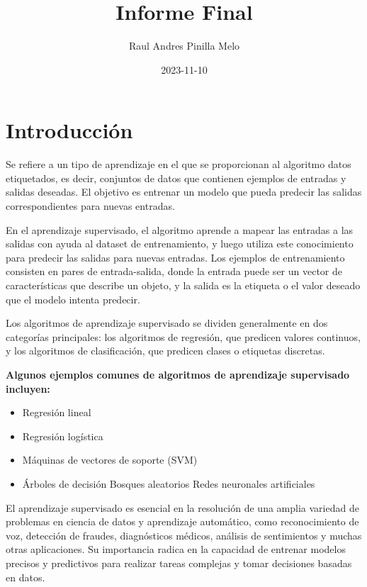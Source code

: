 \documentclass[
]{article}
\title{Informe Final}
\author{Raul Andres Pinilla Melo}
\date{2023-11-10}
\begin{document}
\maketitle

\hypertarget{introducciuxf3n}{%
\section{Introducción}\label{introducciuxf3n}}

Se refiere a un tipo de aprendizaje en el que se proporcionan al
algoritmo datos etiquetados, es decir, conjuntos de datos que contienen
ejemplos de entradas y salidas deseadas. El objetivo es entrenar un
modelo que pueda predecir las salidas correspondientes para nuevas
entradas.

En el aprendizaje supervisado, el algoritmo aprende a mapear las
entradas a las salidas con ayuda al dataset de entrenamiento, y luego
utiliza este conocimiento para predecir las salidas para nuevas
entradas. Los ejemplos de entrenamiento consisten en pares de
entrada-salida, donde la entrada puede ser un vector de características
que describe un objeto, y la salida es la etiqueta o el valor deseado
que el modelo intenta predecir.

Los algoritmos de aprendizaje supervisado se dividen generalmente en dos
categorías principales: los algoritmos de regresión, que predicen
valores continuos, y los algoritmos de clasificación, que predicen
clases o etiquetas discretas.

\textbf{Algunos ejemplos comunes de algoritmos de aprendizaje
supervisado incluyen:}

\begin{itemize}
\item
  Regresión lineal
\item
  Regresión logística
\item
  Máquinas de vectores de soporte (SVM)
\item
  Árboles de decisión Bosques aleatorios Redes neuronales artificiales
\end{itemize}

El aprendizaje supervisado es esencial en la resolución de una amplia
variedad de problemas en ciencia de datos y aprendizaje automático, como
reconocimiento de voz, detección de fraudes, diagnósticos médicos,
análisis de sentimientos y muchas otras aplicaciones. Su importancia
radica en la capacidad de entrenar modelos precisos y predictivos para
realizar tareas complejas y tomar decisiones basadas en datos.
\end{document}
